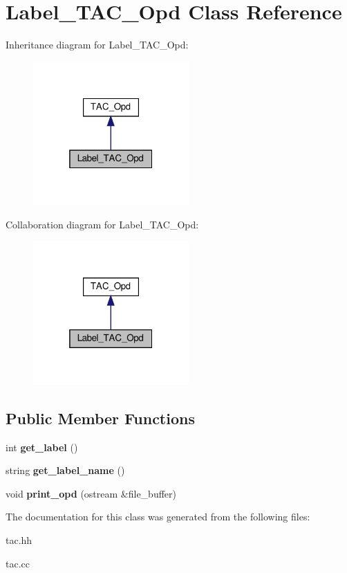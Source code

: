 \hypertarget{classLabel__TAC__Opd}{}\section{Label\+\_\+\+T\+A\+C\+\_\+\+Opd Class Reference}
\label{classLabel__TAC__Opd}


Inheritance diagram for Label\+\_\+\+T\+A\+C\+\_\+\+Opd\+:
\nopagebreak
\begin{figure}[H]
\begin{center}
\leavevmode
\includegraphics[width=169pt]{classLabel__TAC__Opd__inherit__graph}
\end{center}
\end{figure}


Collaboration diagram for Label\+\_\+\+T\+A\+C\+\_\+\+Opd\+:
\nopagebreak
\begin{figure}[H]
\begin{center}
\leavevmode
\includegraphics[width=169pt]{classLabel__TAC__Opd__coll__graph}
\end{center}
\end{figure}
\subsection*{Public Member Functions}
\begin{DoxyCompactItemize}
\item 
\mbox{\label{classLabel__TAC__Opd_ad7d0d55af1224228a3a1e5b7e0ee8cfc}} 
int {\bfseries get\+\_\+label} ()
\item 
\mbox{\label{classLabel__TAC__Opd_aef92b743176f4effc7ca8d34941e03e9}} 
string {\bfseries get\+\_\+label\+\_\+name} ()
\item 
\mbox{\label{classLabel__TAC__Opd_a11242fe9f745c9b6fe9017a1c20541d4}} 
void {\bfseries print\+\_\+opd} (ostream \&file\+\_\+buffer)
\end{DoxyCompactItemize}


The documentation for this class was generated from the following files\+:\begin{DoxyCompactItemize}
\item 
tac.\+hh\item 
tac.\+cc\end{DoxyCompactItemize}
